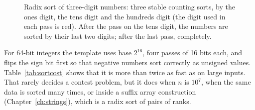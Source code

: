 \begin{figure}[htbp]
\centering
{}
\caption{Radix sort of three-digit numbers: three stable counting sorts, by the ones digit, the tens digit and the hundreds
digit (the digit used in each pass is red). After the pass on the tens digit, the numbers are sorted by their last two
digits; after the last pass, completely.}
\label{fig:radix}
\end{figure}

For 64-bit integers the template uses base $2^{16}$, four passes of 16 bits each, and flips the sign bit first so that
negative numbers sort correctly as unsigned values. Table~\ref{tab:sortcost} shows that it is more than twice as fast as
 on large inputs. That rarely decides a contest problem, but it does when $n$ is $10^7$, when the same data is
sorted many times, or inside a suffix array construction (Chapter~\ref{ch:strings}), which is a radix sort of pairs of ranks.

